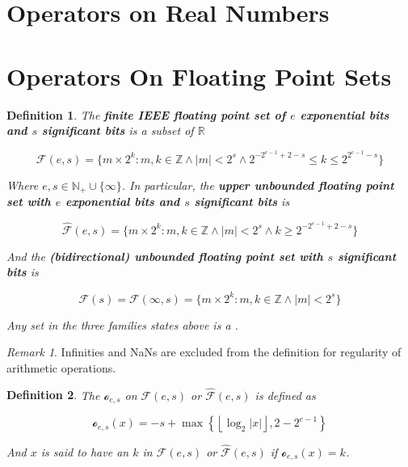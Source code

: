 \documentclass{book}
\newtheorem{definition}{Definition}
\theoremstyle{definition}\newtheorem{mechanism}{Mechanism}
\theoremstyle{remark}\newtheorem*{remark}{Remark}
\begin{document}

\section{Operators on Real Numbers}


\section{Operators On Floating Point Sets}

\begin{definition}
	The {\bf{finite IEEE floating point set of $e$ exponential bits and $s$ significant bits}} is a subset of $\mathbb{R}$
	
	\begin{equation*}
		\mathcal{F}(e, s) = \{m \times 2^k: m, k \in \mathbb{Z} \land |m| < 2^s \land  2^{-2^{e - 1} + 2 - s} \le k \le 2^{2^{e - 1} - s}  \}
	\end{equation*}
	
	Where $e, s \in \mathbb{N}_+\cup \{\infty\}$. In particular, the {\bf{upper unbounded floating point set with $e$ exponential bits and $s$ significant bits}} is
	
	\begin{equation*}
		\hat{\mathcal{F}}(e, s) = \{m \times 2^k: m, k \in \mathbb{Z} \land |m| < 2^ s \land k \ge 2^{-2^{e - 1} + 2 - s}\}
	\end{equation*}
	
	And the {\bf{(bidirectional) unbounded floating point set with $s$ significant bits}} is
	
	\begin{equation*}
		\mathcal{F}(s) = \mathcal{F}(\infty, s) = \{m \times 2^k: m, k \in \mathbb{Z} \land |m| < 2^s\}
	\end{equation*}
	
	Any set in the three families states above is a .
\end{definition}

\begin{remark}
	Infinities and NaNs are excluded from the definition for regularity of arithmetic operations.
\end{remark}

\begin{definition}
	The  $\mathcal o_{e, s}$ on $\mathcal{F}(e, s)$ or $\hat{\mathcal{F}}(e, s)$ is defined as
	
	\begin{equation*}
		\mathcal o_{e, s}(x) = -s + \max\left\{\left\lfloor \log_2 |x| \right\rfloor, 2 - 2^{e - 1}\right\}
	\end{equation*}
	
	And $x$ is said to have an  $k$ in $\mathcal F(e, s)$ or $\hat{\mathcal F}(e, s)$ if $\mathcal o_{e, s}(x) = k$.
\end{definition}
\end{document}

